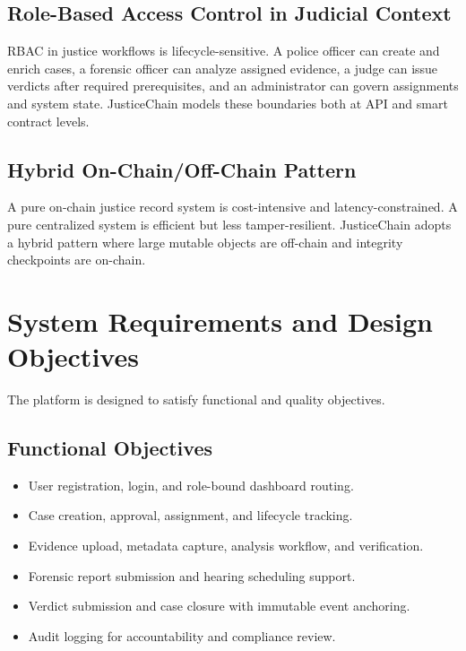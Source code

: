 \documentclass[conference]{IEEEtran}
\begin{document}
\subsection{Role-Based Access Control in Judicial Context}
RBAC in justice workflows is lifecycle-sensitive. A police officer can create and enrich cases, a forensic officer can analyze assigned evidence, a judge can issue verdicts after required prerequisites, and an administrator can govern assignments and system state. JusticeChain models these boundaries both at API and smart contract levels.

\subsection{Hybrid On-Chain/Off-Chain Pattern}
A pure on-chain justice record system is cost-intensive and latency-constrained. A pure centralized system is efficient but less tamper-resilient. JusticeChain adopts a hybrid pattern where large mutable objects are off-chain and integrity checkpoints are on-chain.

\section{System Requirements and Design Objectives}
The platform is designed to satisfy functional and quality objectives.

\subsection{Functional Objectives}
\begin{itemize}
    \item User registration, login, and role-bound dashboard routing.
    \item Case creation, approval, assignment, and lifecycle tracking.
    \item Evidence upload, metadata capture, analysis workflow, and verification.
    \item Forensic report submission and hearing scheduling support.
    \item Verdict submission and case closure with immutable event anchoring.
    \item Audit logging for accountability and compliance review.
\end{itemize}
\end{document}
